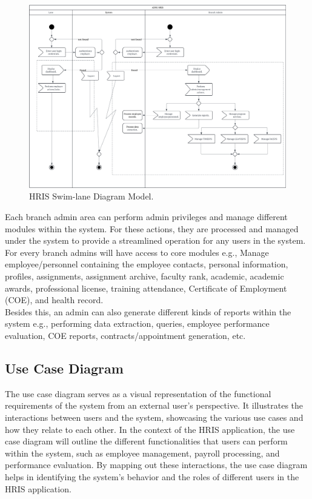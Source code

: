     \begin{figure}[H]
        \centering
        \includegraphics[width=1\linewidth]{figures/fig-4.png}
        \caption{HRIS Swim-lane Diagram Model.}
        \label{fig:enter-label}
    \end{figure}

    Each branch admin area can perform admin privileges and manage different modules within the system. For these actions, they are processed and managed under the system to provide a streamlined operation for any users in the system. For every branch admins will have access to core modules e.g., Manage employee/personnel containing the employee contacts, personal information, profiles, assignments, assignment archive, faculty rank, academic, academic awards, professional license, training attendance, Certificate of Employment (COE), and health record.
    \\

    Besides this, an admin can also generate different kinds of reports within the system e.g., performing data extraction, queries, employee performance evaluation, COE reports, contracts/appointment generation, etc.

    \subsection{Use Case Diagram}
    
    The use case diagram serves as a visual representation of the functional requirements of the system from an external user's perspective. It illustrates the interactions between users and the system, showcasing the various use cases and how they relate to each other. In the context of the HRIS application, the use case diagram will outline the different functionalities that users can perform within the system, such as employee management, payroll processing, and performance evaluation. By mapping out these interactions, the use case diagram helps in identifying the system's behavior and the roles of different users in the HRIS application.

